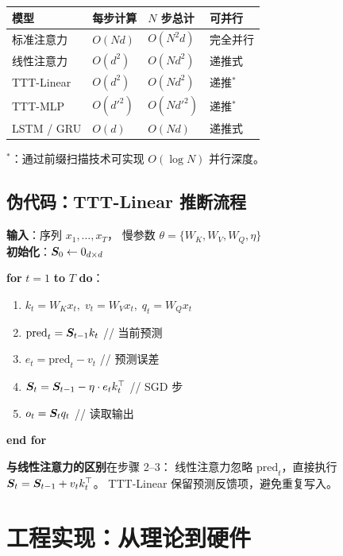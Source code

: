 \begin{center}
\begin{tabular}{p{3cm} p{3cm} p{3cm} p{3cm}}
\toprule
\textbf{模型}
& \textbf{每步计算}
& \textbf{$N$ 步总计}
& \textbf{可并行} \\
\midrule
标准注意力
& $O(Nd)$
& $O(N^2 d)$
& 完全并行 \\
线性注意力
& $O(d^2)$
& $O(Nd^2)$
& 递推式 \\
TTT-Linear
& $O(d^2)$
& $O(Nd^2)$
& 递推$^*$ \\
TTT-MLP
& $O(d'^2)$
& $O(Nd'^2)$
& 递推$^*$ \\
LSTM / GRU
& $O(d)$
& $O(Nd)$
& 递推式 \\
\bottomrule
\end{tabular}
\end{center}

$^*$：通过前缀扫描技术可实现 $O(\log N)$ 并行深度。

\subsection*{伪代码：TTT-Linear 推断流程}

\begin{algorithm}
\textbf{输入}：序列 $x_1, \ldots, x_T$，
慢参数 $\theta = \{W_K, W_V, W_Q, \eta\}$ \\
\textbf{初始化}：$\boldsymbol{S}_0 \gets 0_{d \times d}$

\medskip
\textbf{for} $t = 1$ \textbf{to} $T$ \textbf{do}：
\begin{enumerate}
  \item $k_t = W_K x_t,\; v_t = W_V x_t,\; q_t = W_Q x_t$
  \item $\text{pred}_t = \boldsymbol{S}_{t-1} k_t$ \hfill {\small // 当前预测}
  \item $e_t = \text{pred}_t - v_t$ \hfill {\small // 预测误差}
  \item $\boldsymbol{S}_t = \boldsymbol{S}_{t-1} - \eta \cdot e_t k_t^\top$ \hfill {\small // SGD 步}
  \item $o_t = \boldsymbol{S}_t q_t$ \hfill {\small // 读取输出}
\end{enumerate}
\textbf{end for}
\end{algorithm}

\textbf{与线性注意力的区别}在步骤 2--3：
线性注意力忽略 $\text{pred}_t$，直接执行
$\boldsymbol{S}_t = \boldsymbol{S}_{t-1} + v_t k_t^\top$。
TTT-Linear 保留预测反馈项，避免重复写入。

\section{工程实现：从理论到硬件}
\label{sec:ttt_layers_engineering}

